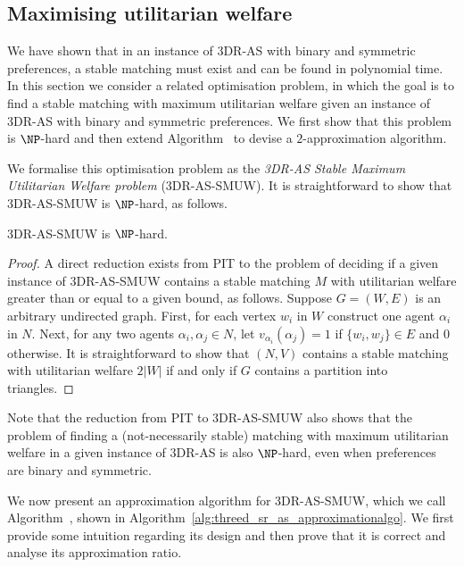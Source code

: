 \subsection{Maximising utilitarian welfare}
\label{sec:threed_sr_as_symmetric_binary_welfare}

We have shown that in an instance of 3DR-AS with binary and symmetric preferences, a stable matching must exist and can be found in polynomial time. In this section we consider a related optimisation problem, in which the goal is to find a stable matching with maximum utilitarian welfare given an instance of 3DR-AS with binary and symmetric preferences. We first show that this problem is $\NP$-hard and then extend Algorithm~ to devise a $2$-approximation algorithm.

We formalise this optimisation problem as the \emph{3DR-AS Stable Maximum Utilitarian Welfare problem} (3DR-AS-SMUW). It is straightforward to show that 3DR-AS-SMUW is $\NP$-hard, as follows.

\begin{thm}
\label{thm:threed_sr_as_maxutilstable_hard}
3DR-AS-SMUW is $\NP$-hard.
\end{thm}
\begin{proof}
A direct reduction exists from PIT to the problem of deciding if a given instance of 3DR-AS-SMUW contains a stable matching $M$ with utilitarian welfare greater than or equal to a given bound, as follows. Suppose $G = (W, E)$ is an arbitrary undirected graph. First, for each vertex $w_i$ in $W$ construct one agent $\alpha_i$ in $N$. Next, for any two agents $\alpha_i, \alpha_j \in N$, let $v_{\alpha_i}(\alpha_j) = 1$ if $\{ w_i, w_j \} \in E$ and $0$ otherwise. It is straightforward to show that $(N, V)$ contains a stable matching with utilitarian welfare $2|W|$ if and only if $G$ contains a partition into triangles.
\end{proof}

Note that the reduction from PIT to 3DR-AS-SMUW also shows that the problem of finding a (not-necessarily stable) matching with maximum utilitarian welfare in a given instance of 3DR-AS is also $\NP$-hard, even when preferences are binary and symmetric.


We now present an approximation algorithm for 3DR-AS-SMUW, which we call Algorithm~, shown in Algorithm~\ref{alg:threed_sr_as_approximationalgo}. We first provide some intuition regarding its design and then prove that it is correct and analyse its approximation ratio.

